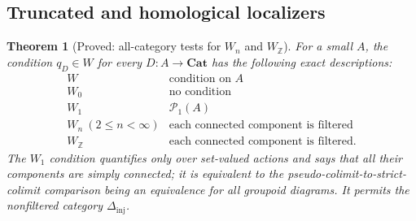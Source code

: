 \documentclass[11pt,a4paper]{article}
\newtheorem{theorem}{Theorem}[section]
\theoremstyle{definition}
\theoremstyle{remark}
\newcommand{\Cat}{\mathbf{Cat}}
\begin{document}
\subsection{Truncated and homological localizers}

\begin{theorem}[Proved: all-category tests for $W_n$ and $W_{\mathbb Z}$]
\label{F:other-localizers}
For a small $A$, the condition $q_D\in W$ for every
$D:A\to\Cat$ has the following exact descriptions:
\[
\begin{array}{c|l}
 W&\text{condition on }A\\\hline
 W_0&\text{no condition}\\
 W_1&\mathcal P_1(A)\\
 W_n\ (2\leq n<\infty)&\text{each connected component is filtered}\\
 W_{\mathbb Z}&\text{each connected component is filtered}.
\end{array}
\]
The $W_1$ condition quantifies only over set-valued actions and says
that all their components are simply connected; it is equivalent
to the pseudo-colimit-to-strict-colimit comparison being an
equivalence for all groupoid diagrams.  It permits the nonfiltered
category $\Delta_{\mathrm{inj}}$.
\end{theorem}
\end{document}
